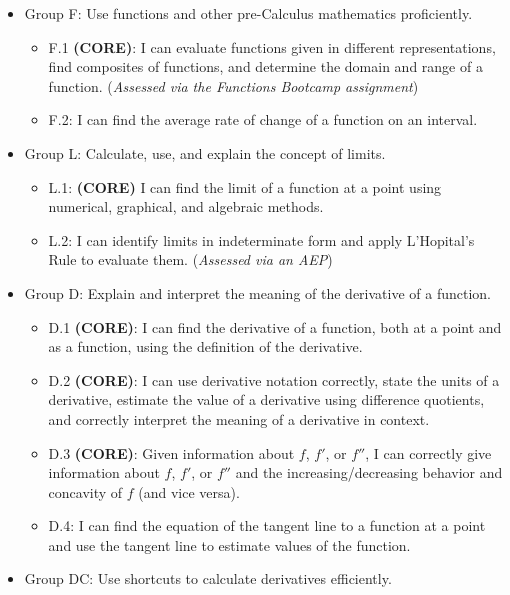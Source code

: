 \documentclass[]{article}
\providecommand{\tightlist}{%
  \setlength{\itemsep}{0pt}\setlength{\parskip}{0pt}}
\begin{document}
\begin{itemize}
\tightlist
\item
  Group F: Use functions and other pre-Calculus mathematics
  proficiently.

  \begin{itemize}
  \tightlist
  \item
    F.1 \textbf{(CORE)}: I can evaluate functions given in different
    representations, find composites of functions, and determine the
    domain and range of a function. (\emph{Assessed via the Functions
    Bootcamp assignment})
  \item
    F.2: I can find the average rate of change of a function on an
    interval.
  \end{itemize}
\item
  Group L: Calculate, use, and explain the concept of limits.

  \begin{itemize}
  \tightlist
  \item
    L.1: \textbf{(CORE)} I can find the limit of a function at a point
    using numerical, graphical, and algebraic methods.
  \item
    L.2: I can identify limits in indeterminate form and apply
    L'Hopital's Rule to evaluate them. (\emph{Assessed via an AEP})
  \end{itemize}
\item
  Group D: Explain and interpret the meaning of the derivative of a
  function.

  \begin{itemize}
  \tightlist
  \item
    D.1 \textbf{(CORE)}: I can find the derivative of a function, both
    at a point and as a function, using the definition of the
    derivative.
  \item
    D.2 \textbf{(CORE)}: I can use derivative notation correctly, state
    the units of a derivative, estimate the value of a derivative using
    difference quotients, and correctly interpret the meaning of a
    derivative in context.
  \item
    D.3 \textbf{(CORE)}: Given information about \(f\), \(f'\), or
    \(f''\), I can correctly give information about \(f\), \(f'\), or
    \(f''\) and the increasing/decreasing behavior and concavity of
    \(f\) (and vice versa).
  \item
    D.4: I can find the equation of the tangent line to a function at a
    point and use the tangent line to estimate values of the function.
  \end{itemize}
\item
  Group DC: Use shortcuts to calculate derivatives efficiently.


\end{itemize}
\end{document}
